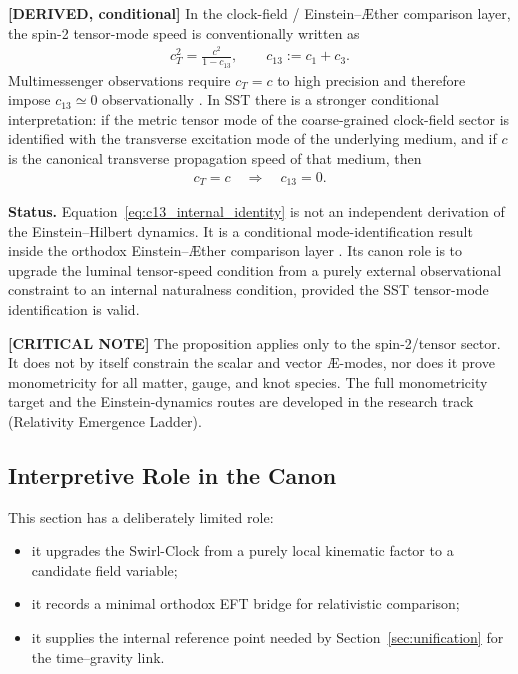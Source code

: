 \documentclass[11pt]{article}
\theoremstyle{definition}
\theoremstyle{plain}
\theoremstyle{remark}
\begin{document}
        \textbf{[DERIVED, conditional]} In the clock-field / Einstein--\AE ther
        comparison layer, the spin-2 tensor-mode speed is conventionally written as
        \begin{align}
            c_T^2
            =
            \frac{c^2}{1-c_{13}},
            \qquad
            c_{13}:=c_1+c_3 .
            \label{eq:eaether_tensor_speed}
        \end{align}
        Multimessenger observations require \(c_T=c\) to high precision and therefore
        impose \(c_{13}\simeq 0\) observationally \cite{Monitor2017,Abbott2017GW170817}. In SST there is a stronger conditional
        interpretation: if the metric tensor mode of the coarse-grained clock-field
        sector is identified with the transverse excitation mode of the underlying
        medium, and if \(c\) is the canonical transverse propagation speed of that
        medium, then
        \begin{align}
            c_T=c
            \quad\Longrightarrow\quad
            c_{13}=0 .
            \label{eq:c13_internal_identity}
        \end{align}

        \textbf{Status.} Equation~\eqref{eq:c13_internal_identity} is not an
        independent derivation of the Einstein--Hilbert dynamics. It is a conditional
        mode-identification result inside the orthodox Einstein--\AE ther comparison
        layer \cite{JacobsonMattingly2001,FosterJacobson2006}. Its canon role is to upgrade the luminal tensor-speed condition from a
        purely external observational constraint to an internal naturalness condition,
        provided the SST tensor-mode identification is valid.

        \textbf{[CRITICAL NOTE]} The proposition applies only to the spin-2/tensor
        sector. It does not by itself constrain the scalar and vector \AE{}-modes,
        nor does it prove monometricity for all matter, gauge, and knot species. The
        full monometricity target and the Einstein-dynamics routes are developed in the
        research track (Relativity Emergence Ladder).

    \subsection{Interpretive Role in the Canon}

        This section has a deliberately limited role:
        \begin{itemize}
            \item it upgrades the Swirl-Clock from a purely local kinematic factor to a candidate field variable;
            \item it records a minimal orthodox EFT bridge for relativistic comparison;
            \item it supplies the internal reference point needed by Section~\ref{sec:unification} for the time--gravity link.
        \end{itemize}
\end{document}
